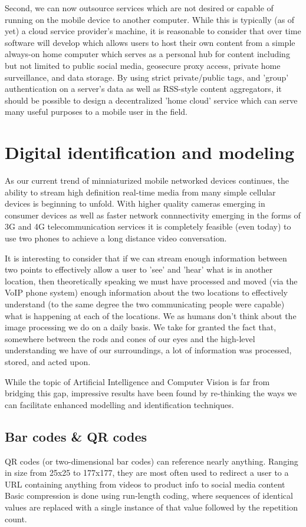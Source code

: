 \documentclass[final,a4paper,12pt]{report}
\begin{document}
Second, we can now outsource services which are not desired or capable of running on the mobile device to another computer. While this is typically (as of yet) a cloud service provider's machine, it is reasonable to consider that over time software will develop which allows users to host their own content from a simple always-on home computer which serves as a personal hub for content including but not limited to public social media, geosecure proxy access, private home surveillance, and data storage. By using strict private/public tags, and 'group' authentication on a server's data as well as RSS-style content aggregators, it should be possible to design a decentralized 'home cloud' service which can serve many useful purposes to a mobile user in the field.

\section{Digital identification and modeling}

As our current trend of minniaturized mobile networked devices continues, the ability to stream high definition real-time media from many simple cellular devices is beginning to unfold. With higher quality cameras emerging in consumer devices as well as faster network connnectivity emerging in the forms of 3G and 4G telecommunication services it is completely feasible (even today) to use two phones to achieve a long distance video conversation.

It is interesting to consider that if we can stream enough information between two points to effectively allow a user to 'see' and 'hear' what is in another location, then theoretically speaking we must have processed and moved (via the VoIP phone system) enough information about the two locations to effectively understand (to the same degree the two communicating people were capable) what is happening at each of the locations. We as humans don't think about the image processing we do on a daily basis. We take for granted the fact that, somewhere between the rods and cones of our eyes and the high-level understanding we have of our surroundings, a lot of information was processed, stored, and acted upon.

While the topic of Artificial Intelligence and Computer Vision is far from bridging this gap, impressive results have been found by re-thinking the ways we can facilitate enhanced modelling and identification techniques.

\subsection{Bar codes \& QR codes}
QR codes (or two-dimensional bar codes) can reference nearly anything. Ranging in size from 25x25 to 177x177, they are most often used to redirect a user to a URL containing anything from videos to product info to social media content \cite{6182398}
Basic compression is done using run-length coding, where sequences of identical values are replaced with a single instance of that value followed by the repetition count. \cite{6182398}
\end{document}
